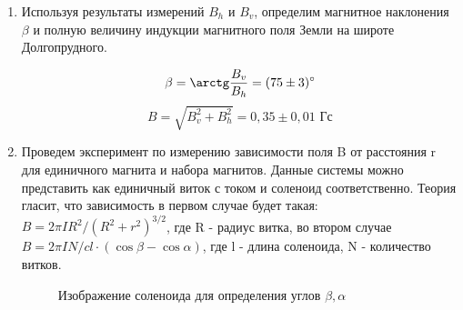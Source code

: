 \documentclass[a4paper, 12pt]{article}%
\begin{document}
\begin{enumerate}
		\begin{figure}[H]
			\caption{}
		\end{figure}
		
		\item Используя результаты измерений $B_h$ и $B_v$, определим магнитное наклонения $\beta$ и полную величину индукции магнитного поля Земли на широте Долгопрудного.
		
		$$ \beta = \arctg \frac{B_v}{B_h} = (75\pm 3) ^{\circ} $$
		$$ B = \sqrt{B_v^2 + B_h^2} = 0,35 \pm 0,01 \text{  Гс}$$
		
		
		\item Проведем эксперимент по измерению зависимости поля B от расстояния r для единичного магнита и набора магнитов. Данные системы можно представить как единичный виток с током и соленоид соответственно. Теория гласит, что зависимость в первом случае будет такая: $B = 2\pi IR^2/(R^2 + r^2)^{3/2} $, где R - радиус витка, во втором случае $B = 2\pi IN/cl \cdot (\cos \beta - \cos \alpha)$, где l - длина соленоида, N - количество витков.
		
		\begin{figure}[H]
			\caption{Изображение соленоида для определения углов $\beta, \alpha$ }
		\end{figure}
		

\end{enumerate}
\end{document}
